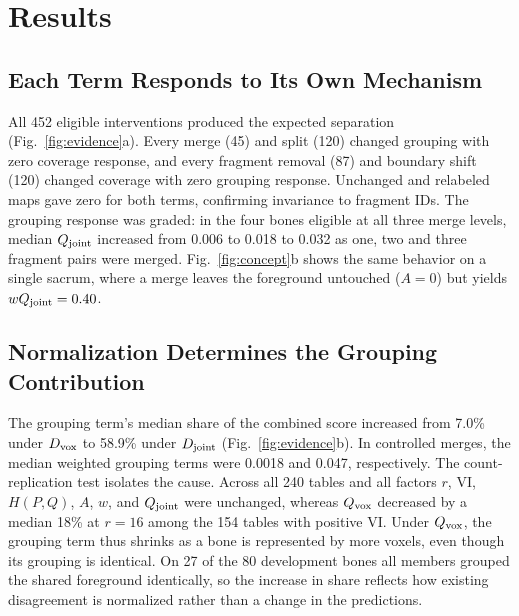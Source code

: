 \documentclass[conference]{IEEEtran}
\begin{document}
\section{Results}
\subsection{Each Term Responds to Its Own Mechanism}
All 452 eligible interventions produced the expected separation (Fig.~\ref{fig:evidence}a). Every merge (45) and split (120) changed grouping with zero coverage response, and every fragment removal (87) and boundary shift (120) changed coverage with zero grouping response. Unchanged and relabeled maps gave zero for both terms, confirming invariance to fragment IDs. The grouping response was graded: in the four bones eligible at all three merge levels, median $Q_{\rm joint}$ increased from 0.006 to 0.018 to 0.032 as one, two and three fragment pairs were merged. Fig.~\ref{fig:concept}b shows the same behavior on a single sacrum, where a merge leaves the foreground untouched ($A=0$) but yields $wQ_{\rm joint}=0.40$.

\subsection{Normalization Determines the Grouping Contribution}
The grouping term's median share of the combined score increased from 7.0\% under $D_{\rm vox}$ to 58.9\% under $D_{\rm joint}$ (Fig.~\ref{fig:evidence}b). In controlled merges, the median weighted grouping terms were 0.0018 and 0.047, respectively. The count-replication test isolates the cause. Across all 240 tables and all factors $r$, VI, $H(P,Q)$, $A$, $w$, and $Q_{\rm joint}$ were unchanged, whereas $Q_{\rm vox}$ decreased by a median 18\% at $r=16$ among the 154 tables with positive VI. Under $Q_{\rm vox}$, the grouping term thus shrinks as a bone is represented by more voxels, even though its grouping is identical. On 27 of the 80 development bones all members grouped the shared foreground identically, so the increase in share reflects how existing disagreement is normalized rather than a change in the predictions.


\end{document}
